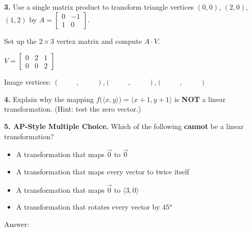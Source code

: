 \documentclass[10pt]{article}
\begin{document}
\vspace{0.10in}

\begin{notesbox}
\textbf{3.} Use a single matrix product to transform triangle vertices
$(0,0)$, $(2,0)$, $(1,2)$ by $A=\begin{bmatrix}0&-1\\1&0\end{bmatrix}$.

\vspace{0.06in}
Set up the $2\times3$ vertex matrix and compute $A \cdot V$.

\vspace{0.06in}
$V = \begin{bmatrix}0&2&1\\0&0&2\end{bmatrix}$


Image vertices: $(\hspace{1cm},\hspace{1cm})$,\quad $(\hspace{1cm},\hspace{1cm})$,\quad $(\hspace{1cm},\hspace{1cm})$
\end{notesbox}

\vspace{0.10in}

\begin{notesbox}
\textbf{4.} Explain why the mapping
$f\bigl(\langle x,y\rangle\bigr)=\langle x+1,y+1\rangle$
is \textbf{NOT} a linear transformation. (Hint: test the zero vector.)

\end{notesbox}

\vspace{0.10in}

\begin{notesbox}
\textbf{5. AP-Style Multiple Choice.}
Which of the following \textbf{cannot} be a linear transformation?

\vspace{0.08in}
\begin{itemize}[leftmargin=2em, itemsep=4pt]
  \item[(A)] A transformation that maps $\vec{0}$ to $\vec{0}$
  \item[(B)] A transformation that maps every vector to twice itself
  \item[(C)] A transformation that maps $\vec{0}$ to $\langle3,0\rangle$
  \item[(D)] A transformation that rotates every vector by $45°$
\end{itemize}

\vspace{0.08in}
Answer: \blank{2cm}
\end{notesbox}
\end{document}

